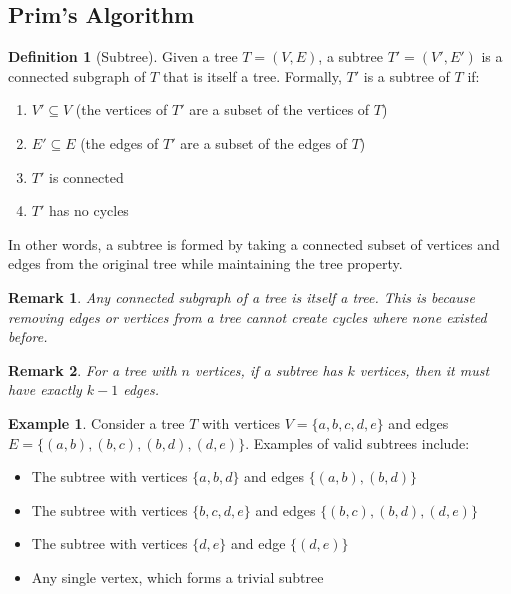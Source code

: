\documentclass{article}
\newtheorem{remark}{Remark}
\theoremstyle{definition}
\newtheorem{example}{Example}
\newtheorem{definition}{Definition}
\begin{document}
\pagebreak
\subsection{Prim's Algorithm}

\begin{definition}[Subtree]
Given a tree $T = (V, E)$, a subtree $T' = (V', E')$ is a connected subgraph of $T$ that is itself a tree. Formally, $T'$ is a subtree of $T$ if:
\begin{enumerate}
\item $V' \subseteq V$ (the vertices of $T'$ are a subset of the vertices of $T$)
\item $E' \subseteq E$ (the edges of $T'$ are a subset of the edges of $T$)
\item $T'$ is connected
\item $T'$ has no cycles
\end{enumerate}
In other words, a subtree is formed by taking a connected subset of vertices and edges from the original tree while maintaining the tree property.
\end{definition}

\begin{remark}
Any connected subgraph of a tree is itself a tree. This is because removing edges or vertices from a tree cannot create cycles where none existed before.
\end{remark}

\begin{remark}
For a tree with $n$ vertices, if a subtree has $k$ vertices, then it must have exactly $k-1$ edges.
\end{remark}

\begin{example}
Consider a tree $T$ with vertices $V = \{a, b, c, d, e\}$ and edges $E = \{(a,b), (b,c), (b,d), (d,e)\}$. Examples of valid subtrees include:
\begin{itemize}
\item The subtree with vertices $\{a, b, d\}$ and edges $\{(a,b), (b,d)\}$
\item The subtree with vertices $\{b, c, d, e\}$ and edges $\{(b,c), (b,d), (d,e)\}$
\item The subtree with vertices $\{d, e\}$ and edge $\{(d,e)\}$
\item Any single vertex, which forms a trivial subtree
\end{itemize}
\end{example}
\end{document}
